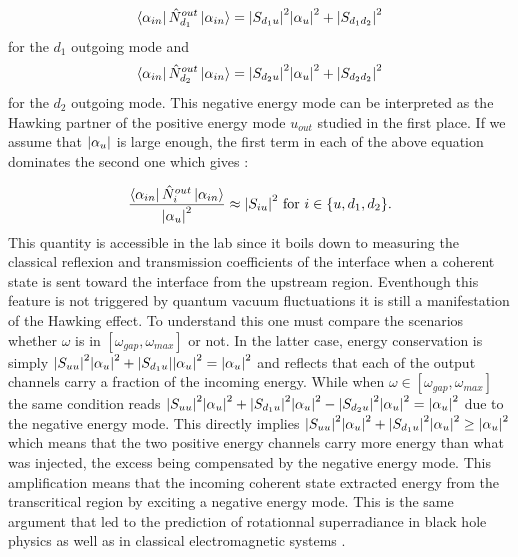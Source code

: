 \begin{equation}
    \bra{\alpha_{in}}\hat{N}_{d_1}^{out}\ket{\alpha_{in}} = \abs{S_{d_1u}}^2\abs{\alpha_u}^2 + \abs{S_{d_1d_2}}^2
    \label{eq:d1_stimulated_expectation_value}
\end{equation}
for the $d_1$ outgoing mode and 
\begin{equation}
    \bra{\alpha_{in}}\hat{N}_{d_2}^{out}\ket{\alpha_{in}} = \abs{S_{d_2u}}^2\abs{\alpha_u}^2 + \abs{S_{d_2d_2}}^2
    \label{eq:d2_stimulated_expectation_value}
\end{equation}
for the $d_2$ outgoing mode. This negative energy mode can be interpreted as the Hawking partner of the positive energy mode $u_{out}$ studied in the first place.
If we assume that $\abs{\alpha_u}$ is large enough, the first term in each of the above equation dominates the second one which gives :

\begin{equation}
    \dfrac{\bra{\alpha_{in}}\hat{N}_i^{out}\ket{\alpha_{in}}}{\abs{\alpha_u}^2} \approx \abs{S_{i u}}^2 \ \mathrm{for} \ i\in\{u,d_1,d_2\}.
\end{equation}
This quantity is accessible in the lab since it boils down to measuring the classical reflexion and transmission coefficients of the interface when a
coherent state is sent toward the interface from the upstream region. Eventhough this feature is not triggered by quantum vacuum 
fluctuations it is still a manifestation of the Hawking effect. To understand this one must compare the scenarios
whether $\omega$ is in $[\omega_{gap}, \omega_{max}]$ or not. In the latter case, energy conservation is simply $\abs{S_{uu}}^2\abs{\alpha_u}^2+\abs{S_{d_1u}}\abs{\alpha_u}^2=\abs{\alpha_u}^2$ and reflects that each of the output channels
carry a fraction of the incoming energy. While when $\omega \in [\omega_{gap}, \omega_{max}]$ the same condition reads $\abs{S_{uu}}^2\abs{\alpha_u}^2+\abs{S_{d_1u}}^2\abs{\alpha_u}^2-\abs{S_{d_2u}}^2\abs{\alpha_u}^2=\abs{\alpha_u}^2$ due to the negative energy mode.
This directly implies $\abs{S_{uu}}^2\abs{\alpha_u}^2+\abs{S_{d_1u}}^2\abs{\alpha_u}^2\geq \abs{\alpha_u}^2$ which means that the two positive energy channels
carry more energy than what was injected, the excess being compensated by the negative energy mode. This amplification means that the incoming 
coherent state extracted energy from the transcritical region by exciting a negative energy mode. This is the same argument that led to the prediction of rotationnal superradiance in black hole physics \cite{hawking_black_1972} as well as in classical electromagnetic systems \cite{zeldovich__1970}.

